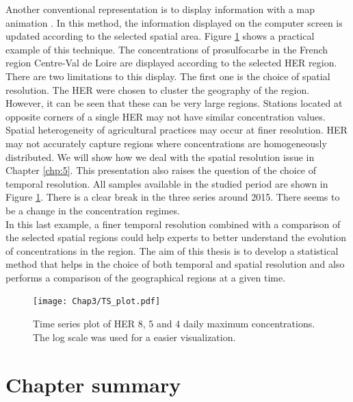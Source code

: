 Another conventional representation is to display information with a map animation \citep{Andrienko2003}. In this method, the information displayed on the computer screen is updated according to the selected spatial area. Figure \ref{fig:tsplot_ex} shows a practical example of this technique. The concentrations of prosulfocarbe in the French region Centre-Val de Loire are displayed according to the selected HER region. There are two limitations to this display. The first one is the choice of spatial resolution. The HER were chosen to cluster the geography of the region. However, it can be seen that these can be very large regions. Stations located at opposite corners of a single HER may not have similar concentration values. Spatial heterogeneity of agricultural practices may occur at finer resolution. HER may not accurately capture regions where concentrations are homogeneously distributed. We will show how we deal with the spatial resolution issue in Chapter \ref{chp:5}. This presentation also raises the question of the choice of temporal resolution. All samples available in the studied period are shown in Figure \ref{fig:tsplot_ex}. There is a clear break in the three series around 2015. There seems to be a change in the concentration regimes. \\

In this last example, a finer temporal resolution combined with a comparison of the selected spatial regions could help experts to better understand the evolution of concentrations in the region. The aim of this thesis is to develop a statistical method that helps in the choice of both temporal and spatial resolution and also performs a comparison of the geographical regions at a given time.

\begin{figure}[ht]
    \centering
    \texttt{[image: Chap3/TS\_plot.pdf]}
    \caption{Time series plot of HER 8, 5 and 4 daily maximum concentrations. The log scale was used for a easier visualization.}
    \label{fig:tsplot_ex}
\end{figure}

\clearpage

\section{Chapter summary}

